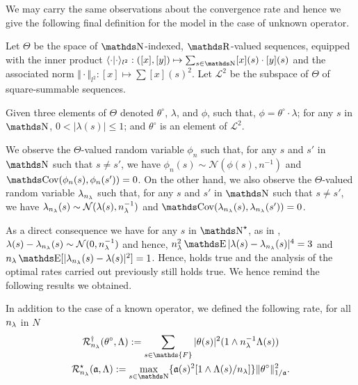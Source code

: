 We may carry the same observations about the convergence rate and hence we give the following final definition for the model in the case of unknown operator.
\begin{de}\label{INTRO_IGSSM_DE_UK}
Let $\Theta$ be the space of $\N$-indexed, $\R$-valued sequences, equipped with the inner product $\langle \cdot \vert \cdot \rangle_{l^{2}} : ([x], [y]) \mapsto \sum_{s \in \N} [x](s) \cdot [y](s)$ and the associated norm $\Vert \cdot \Vert_{l^{2}}: [x] \mapsto \sum[x](s)^{2}$.
Let $\mathcal{L}^{2}$ be the subspace of $\Theta$ of square-summable sequences.

Given three elements of $\Theta$ denoted $\theta^{\circ}$, $\lambda$, and $\phi$, such that, $\phi = \theta^{\circ} \cdot \lambda$; for any $s$ in $\N$, $0 < \vert \lambda(s) \vert \leq 1$; and $\theta^{\circ}$ is an element of $\mathcal{L}^{2}$.

We observe the $\Theta$-valued random variable $\phi_{n}$  such that, for any $s$ and $s'$ in $\N$ such that $s \neq s'$, we have $\phi_{n}(s) \sim \mathcal{N}(\phi(s), n^{-1})$ and $\Cov(\phi_{n}(s), \phi_{n}(s')) = 0$.
On the other hand, we also observe the $\Theta$-valued random variable $\lambda_{n_{\lambda}}$ such that, for any $s$ and $s'$ in $\N$ such that $s \neq s'$, we have $\lambda_{n_{\lambda}}(s) \sim \mathcal{N}(\lambda(s), n_{\lambda}^{-1})$ and $\Cov(\lambda_{\ssE}(s), \lambda_{\ssE}(s')) = 0$.
\assEnd
\end{de}

As a direct consequence we have for any $s$ in $\N^{\star}$, as in , $\lambda(s) - \lambda_{n_{\lambda}}(s) \sim \mathcal{N}(0, n_{\lambda}^{-1})$ and hence, $\ssE^{2} \E\vert \lambda(s) - \lambda_{\ssE}(s) \vert^{4} = 3$ and $n_{\lambda} \E[\vert \lambda_{\ssE}(s) - \lambda(s) \vert^{2}] = 1$.
Hence,  holds true and the analysis of the optimal rates carried out previously still holds true.
We hence remind the following results we obtained.

\begin{nota*}
In addition to the case of a known operator, we defined the following rate, for all $n_{\lambda}$ in $N$
\begin{multline*}
\mathcal{R}_{n_{\lambda}}^{\dagger}(\theta^{\circ}, \Lambda) := \sum_{s \in \mathds{F}}\vert \theta(s) \vert^{2} (1 \wedge n_{\lambda}^{-1} \Lambda(s))\\
\mmRa{\xdfCw[],\Lambda}:=\max_{s\in\N}\{\xdfCw[(s)]^2[1\wedge \iSv[s]/\ssE]\}\Vnorm[1/{\xdfCw[]}]{\xdf}^2.
\end{multline*}
\end{nota*}

